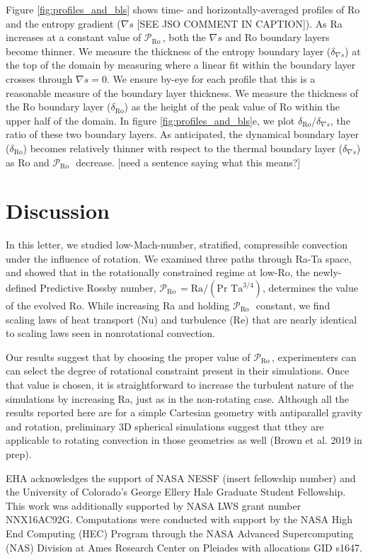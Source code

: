 \documentclass[twocolumn, amsmath, amsfonts, amssymb]{aastex62}
\newcommand{\grad}{\ensuremath{\nabla}}
\newcommand{\pro}{\ensuremath{\mathcal{P}_{\text{Ro}}\,}}
\begin{document}
Figure \ref{fig:profiles_and_bls} shows time- and horizontally-averaged profiles of
Ro and the entropy gradient ($\grad s$ [SEE JSO COMMENT IN CAPTION]). As Ra increases at a constant value of
\pro, both the $\grad s$ and Ro boundary layers become thinner. We measure the
thickness of the entropy boundary layer ($\delta_{\grad s}$) at the top of the domain by 
measuring where a linear fit within the boundary layer crosses through $\grad s = 0$.
We ensure by-eye for each profile that this is a reasonable measure of the boundary
layer thickness. We measure
the thickness of the Ro boundary layer ($\delta_{\text{Ro}}$) 
as the height of the peak value of Ro within the
upper half of the domain.
In figure \ref{fig:profiles_and_bls}e, we plot $\delta_{\text{Ro}}/\delta_{\grad s}$, the ratio
of these two boundary layers. As anticipated, the dynamical boundary layer ($\delta_{\text{Ro}}$)
becomes relatively thinner with respect to the thermal boundary layer ($\delta_{\grad s}$)
as Ro and \pro$\,$ decrease. [need a sentence saying what this means?]

\section{Discussion}
\label{sec:discussion}
In this letter, we studied low-Mach-number, stratified, compressible convection 
under the influence of rotation.
We examined three paths through Ra-Ta space, and showed that in the rotationally
constrained regime at low-Ro, the newly-defined 
Predictive Rossby number, $\pro = \text{Ra}/(\text{Pr }\text{Ta}^{3/4})$, determines the value of
the evolved Ro. While increasing Ra and holding \pro$\,$ constant,
we find scaling laws of heat transport (Nu) and turbulence (Re) that are nearly identical
to scaling laws seen in nonrotational convection.

Our results suggest that by choosing the proper value of \pro, experimenters can
can select the degree of rotational constraint present in their simulations. Once that value is chosen, it is straightforward to increase the turbulent nature of the simulations by increasing Ra, just as in the non-rotating case. Although all the results reported here are for a simple Cartesian geometry with antiparallel gravity and rotation, preliminary 3D spherical simulations suggest that tthey are applicable to rotating convection in
those geometries as well (Brown et al. 2019 in prep).


\begin{acknowledgements}
EHA acknowledges the support of NASA NESSF (insert fellowship number)
and the University of Colorado's George 
Ellery Hale Graduate Student Fellowship.
This work was additionally supported by  NASA LWS grant number NNX16AC92G.  
Computations were conducted 
with support by the NASA High End Computing (HEC) Program through the NASA 
Advanced Supercomputing (NAS) Division at Ames Research Center on Pleiades
with allocations GID s1647.
\end{acknowledgements}

\newpage

\end{document}
